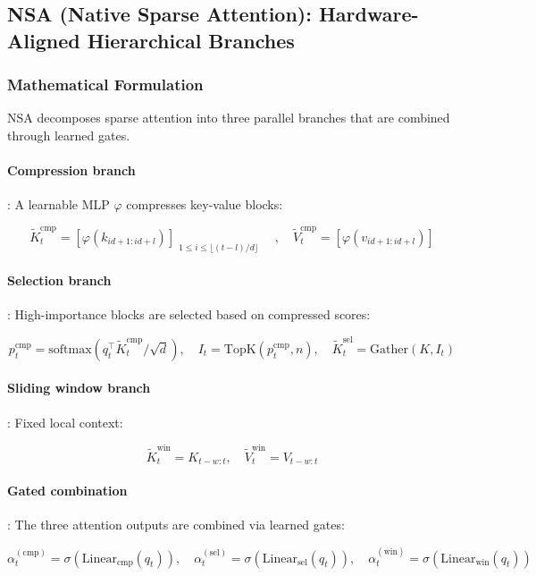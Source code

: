 \subsection{NSA (Native Sparse Attention): Hardware-Aligned Hierarchical Branches}

\subsubsection{Mathematical Formulation}

NSA \citep{yuan_nsa_2025} decomposes sparse attention into three parallel branches that are combined through learned gates.

\paragraph{Compression branch}: A learnable MLP $\varphi$ compresses key-value blocks:

\[
\tilde{K}_t^{\text{cmp}} = \left[\varphi(k_{id+1:id+l})\right]_{\substack{1 \leq i \leq \lfloor(t-l)/d\rfloor}} \quad, \quad \tilde{V}_t^{\text{cmp}} = \left[\varphi(v_{id+1:id+l})\right]
\]

\paragraph{Selection branch}: High-importance blocks are selected based on compressed scores:

\[
p_t^{\text{cmp}} = \text{softmax}(q_t^\top \tilde{K}_t^{\text{cmp}} / \sqrt{d}), \quad I_t = \mathrm{TopK}(p_t^{\text{cmp}}, n), \quad \tilde{K}_t^{\text{sel}} = \mathrm{Gather}(K, I_t)
\]

\paragraph{Sliding window branch}: Fixed local context:

\[
\tilde{K}_t^{\text{win}} = K_{t-w:t}, \quad \tilde{V}_t^{\text{win}} = V_{t-w:t}
\]

\paragraph{Gated combination}: The three attention outputs are combined via learned gates:

\[
\alpha_t^{(\text{cmp})} = \sigma(\text{Linear}_\text{cmp}(q_t)), \quad \alpha_t^{(\text{sel})} = \sigma(\text{Linear}_\text{sel}(q_t)), \quad \alpha_t^{(\text{win})} = \sigma(\text{Linear}_\text{win}(q_t))
\]

